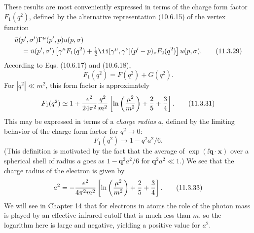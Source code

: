 These results are most conveniently expressed in terms of the charge form
factor $F_1(q^2)$, defined by the alternative representation (10.6.15) of the
vertex function
\begin{align}
&\bar u(p',\sigma')\Gamma^\mu(p',p)u(p,\sigma)\notag\\
&\quad=\bar u(p',\sigma')\left[\gamma^\mu F_1(q^2)
 +\tfrac12\ii[\gamma^\mu,\gamma^\nu](p'-p)_\nu F_2(q^2)\right]u(p,\sigma).
\tag{11.3.29}\label{eq:11.3.29}
\end{align}
According to Eqs. (10.6.17) and (10.6.18),
\begin{equation}
F_1(q^2)=F(q^2)+G(q^2).
\tag{11.3.30}\label{eq:11.3.30}
\end{equation}
For $|q^2|\ll m^2$, this form factor is approximately
\begin{equation}
F_1(q^2)\simeq1+{e^2\over24\pi^2}{q^2\over m^2}
 \left[\ln\left({\mu^2\over m^2}\right)+{2\over5}+{3\over4}\right].
\tag{11.3.31}\label{eq:11.3.31}
\end{equation}
This may be expressed in terms of a \emph{charge radius} $a$, defined by the
limiting behavior of the charge form factor for $q^2\longrightarrow0$:
\begin{equation}
F_1(q^2)\longrightarrow1-q^2a^2/6.
\tag{11.3.32}\label{eq:11.3.32}
\end{equation}
(This definition is motivated by the fact that the average of
$\exp(\ii\mathbf q\cdot\mathbf x)$ over a spherical shell of radius $a$ goes as
$1-\mathbf q^2a^2/6$ for $\mathbf q^2a^2\ll1$.) We see that the charge
radius of the electron is given by
\begin{equation}
a^2=-{e^2\over4\pi^2m^2}
 \left[\ln\left({\mu^2\over m^2}\right)+{2\over5}+{3\over4}\right].
\tag{11.3.33}\label{eq:11.3.33}
\end{equation}
We will see in Chapter 14 that for electrons in atoms the role of the photon
mass is played by an effective infrared cutoff that is much less than $m$, so
the logarithm here is large and negative, yielding a positive value for
$a^2$.
